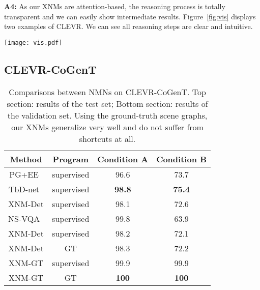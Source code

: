 \documentclass[10pt,twocolumn,letterpaper]{article}
\begin{document}
\textbf{A4:}
As our XNMs are attention-based, the reasoning process is totally transparent and we can easily show intermediate results.
Figure~\ref{fig:vis} displays two examples of CLEVR.
We can see all reasoning steps are clear and intuitive.



\begin{figure*}[t]
\centering
\texttt{[image: vis.pdf]}
\caption{Reasoning visualizations of two CLEVR samples. Question 1: \textit{What number of objects are either big objects that are behind the big gray block or tiny brown rubber balls?} Question 2: \textit{The other small shiny thing that is the same shape as the tiny yellow shiny object is what color?} We plot a dot for each object and darker (red) dots indicate higher attention weights.}
\label{fig:vis}
\vspace{-0.3cm}
\end{figure*}











\subsection{CLEVR-CoGenT}


\begin{table}[h]
    \caption{Comparisons between NMNs on CLEVR-CoGenT. Top section: results of the test set; Bottom section: results of the validation set. Using the ground-truth scene graphs, our XNMs generalize very well and do not suffer from shortcuts at all.}
    \centering
    \small
    \begin{tabular}{|c|c|c|c|}
    \hline
    Method                          &    Program   &    Condition A     &   Condition B \\
    \hline
    PG+EE~\cite{johnson2017inferring} &     supervised    &     96.6    &   73.7    \\
    TbD-net~\cite{mascharka2018transparency} &     supervised    &   \textbf{98.8}    &    \textbf{75.4} \\
    XNM-Det  &     supervised    &    98.1   &   72.6 \\
    \hline
    \hline
    NS-VQA~\cite{yi2018nsvqa}       &     supervised    &    99.8    &    63.9 \\
    XNM-Det  &     supervised    &    98.2   &   72.1 \\
    XNM-Det  &     GT    &    98.3   &   72.2 \\
    XNM-GT  &     supervised    &    99.9   &   99.9  \\
    XNM-GT  &     GT    &    \textbf{100}   &   \textbf{100}  \\
    \hline
    \end{tabular}
    \label{tab:cogent-results}
\vspace{-0.3cm}
\end{table}
\end{document}

